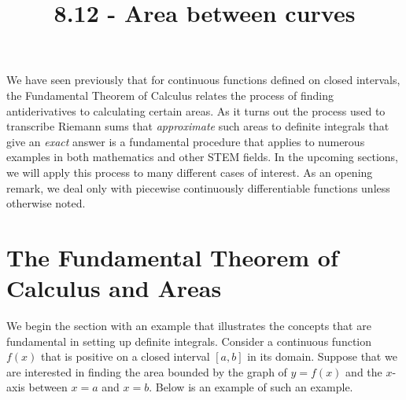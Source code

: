 \documentclass{ximera}
\title{8.12 - Area between curves}
\begin{document}
\begin{abstract}
\end{abstract}
\maketitle

We have seen previously that for continuous functions defined on closed intervals, the Fundamental Theorem of Calculus relates the process of finding antiderivatives to calculating certain areas.  As it turns out the process used to transcribe Riemann sums that \emph{approximate} such areas to definite integrals that give an \emph{exact} answer is a fundamental procedure that applies to numerous examples in both mathematics and other STEM fields.  In the upcoming sections, we will apply this process to many different cases of interest.  As an opening remark, we deal only with piecewise continuously differentiable functions unless otherwise noted.  

\section{The Fundamental Theorem of Calculus and Areas}

We begin the section with an example that illustrates the concepts that are fundamental in setting up definite integrals.  Consider a continuous function $f(x)$ that is positive on a closed interval $[a,b]$ in its domain.   Suppose that we are interested in finding the area bounded by the graph of $y=f(x)$ and the $x$-axis between $x=a$ and $x=b$.  Below is an example of such an example.


\end{document}
